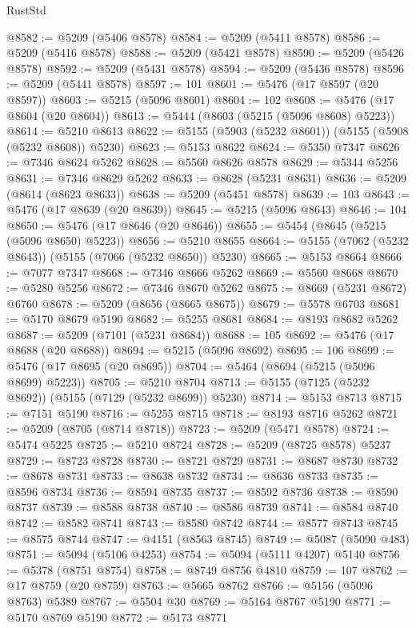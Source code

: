 \begin{lexlean}{RustStd}
\begin{coremodule}
@8582 := @5209 (@5406 @8578)
@8584 := @5209 (@5411 @8578)
@8586 := @5209 (@5416 @8578)
@8588 := @5209 (@5421 @8578)
@8590 := @5209 (@5426 @8578)
@8592 := @5209 (@5431 @8578)
@8594 := @5209 (@5436 @8578)
@8596 := @5209 (@5441 @8578)
@8597 := 101
@8601 := @5476 (@17 @8597 (@20 @8597))
@8603 := @5215 (@5096 @8601)
@8604 := 102
@8608 := @5476 (@17 @8604 (@20 @8604))
@8613 := @5444 (@8603 (@5215 (@5096 @8608) @5223))
@8614 := @5210 @8613
@8622 := @5155 (@5903 (@5232 @8601)) (@5155 (@5908 (@5232 @8608)) @5230)
@8623 := @5153 @8622
@8624 := @5350 @7347
@8626 := @7346 @8624 @5262
@8628 := @5560 @8626 @8578
@8629 := @5344 @5256
@8631 := @7346 @8629 @5262
@8633 := @8628 (@5231 @8631)
@8636 := @5209 (@8614 (@8623 @8633))
@8638 := @5209 (@5451 @8578)
@8639 := 103
@8643 := @5476 (@17 @8639 (@20 @8639))
@8645 := @5215 (@5096 @8643)
@8646 := 104
@8650 := @5476 (@17 @8646 (@20 @8646))
@8655 := @5454 (@8645 (@5215 (@5096 @8650) @5223))
@8656 := @5210 @8655
@8664 := @5155 (@7062 (@5232 @8643)) (@5155 (@7066 (@5232 @8650)) @5230)
@8665 := @5153 @8664
@8666 := @7077 @7347
@8668 := @7346 @8666 @5262
@8669 := @5560 @8668
@8670 := @5280 @5256
@8672 := @7346 @8670 @5262
@8675 := @8669 (@5231 @8672) @6760
@8678 := @5209 (@8656 (@8665 @8675))
@8679 := @5578 @6703
@8681 := @5170 @8679 @5190
@8682 := @5255 @8681
@8684 := @8193 @8682 @5262
@8687 := @5209 (@7101 (@5231 @8684))
@8688 := 105
@8692 := @5476 (@17 @8688 (@20 @8688))
@8694 := @5215 (@5096 @8692)
@8695 := 106
@8699 := @5476 (@17 @8695 (@20 @8695))
@8704 := @5464 (@8694 (@5215 (@5096 @8699) @5223))
@8705 := @5210 @8704
@8713 := @5155 (@7125 (@5232 @8692)) (@5155 (@7129 (@5232 @8699)) @5230)
@8714 := @5153 @8713
@8715 := @7151 @5190
@8716 := @5255 @8715
@8718 := @8193 @8716 @5262
@8721 := @5209 (@8705 (@8714 @8718))
@8723 := @5209 (@5471 @8578)
@8724 := @5474 @5225
@8725 := @5210 @8724
@8728 := @5209 (@8725 @8578) @5237
@8729 := @8723 @8728
@8730 := @8721 @8729
@8731 := @8687 @8730
@8732 := @8678 @8731
@8733 := @8638 @8732
@8734 := @8636 @8733
@8735 := @8596 @8734
@8736 := @8594 @8735
@8737 := @8592 @8736
@8738 := @8590 @8737
@8739 := @8588 @8738
@8740 := @8586 @8739
@8741 := @8584 @8740
@8742 := @8582 @8741
@8743 := @8580 @8742
@8744 := @8577 @8743
@8745 := @8575 @8744
@8747 := @4151 (@8563 @8745)
@8749 := @5087 (@5090 @483)
@8751 := @5094 (@5106 @4253)
@8754 := @5094 (@5111 @4207) @5140
@8756 := @5378 (@8751 @8754)
@8758 := @8749 @8756 @4810
@8759 := 107
@8762 := @17 @8759 (@20 @8759)
@8763 := @5665 @8762
@8766 := @5156 (@5096 @8763) @5389
@8767 := @5504 @30
@8769 := @5164 @8767 @5190
@8771 := @5170 @8769 @5190
@8772 := @5173 @8771

\end{coremodule}
\end{lexlean}

